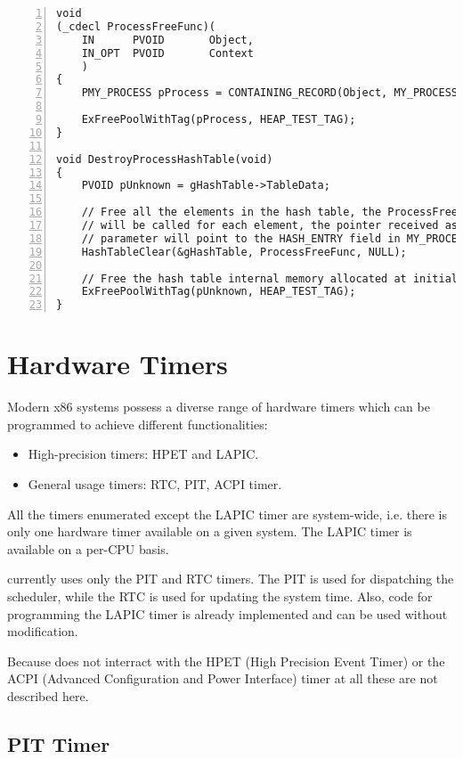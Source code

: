 \begin{appendices}
\begin{lstlisting}[caption={Hash Destruction Example},label={lst:HashDestEg},numbers=left]
void
(_cdecl ProcessFreeFunc)(
    IN      PVOID       Object,
    IN_OPT  PVOID       Context
    )
{
	PMY_PROCESS pProcess = CONTAINING_RECORD(Object, MY_PROCESS, HashEntry);
	
	ExFreePoolWithTag(pProcess, HEAP_TEST_TAG);
}

void DestroyProcessHashTable(void)
{
	PVOID pUnknown = gHashTable->TableData;

	// Free all the elements in the hash table, the ProcessFreeFunc function
	// will be called for each element, the pointer received as the first
	// parameter will point to the HASH_ENTRY field in MY_PROCESS
	HashTableClear(&gHashTable, ProcessFreeFunc, NULL);

	// Free the hash table internal memory allocated at initialization
	ExFreePoolWithTag(pUnknown, HEAP_TEST_TAG);
}
\end{lstlisting}

\section{Hardware Timers}

Modern x86 systems possess a diverse range of hardware timers which can be programmed to achieve different
functionalities:
\begin{itemize}
	\item High-precision timers: HPET and LAPIC.
	\item General usage timers: RTC, PIT, ACPI timer.
\end{itemize}

All the timers enumerated except the LAPIC timer are system-wide, i.e. there is only one hardware timer available on a
given system. The LAPIC timer is available on a per-CPU basis.

\projectname currently uses only the PIT and RTC timers. The PIT is used for dispatching the scheduler, while the RTC is
used for updating the system time. Also, code for programming the LAPIC timer is already implemented and can be used
without modification.

Because \projectname does not interract with the HPET (High Precision Event Timer) or the ACPI (Advanced Configuration
and Power Interface) timer at all these are not described here.

\subsection{PIT Timer}


\end{appendices}
